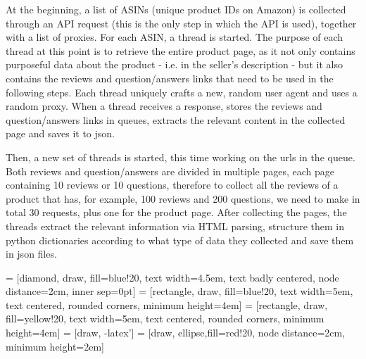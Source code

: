 \documentclass[LaM,binding=0.6cm]{sapthesis}
\begin{document}
At the beginning, a list of ASINs (unique product IDs on Amazon) is collected through an API request (this is the only step in which the API is used), together with a list of proxies. For each ASIN, a thread is started. The purpose of each thread at this point is to retrieve the entire product page, as it not only contains purposeful data about the product - i.e. in the seller's description - but it also contains the reviews and question/answers links that need to be used in the following steps. Each thread uniquely crafts a new, random user agent and uses a random proxy. When a thread receives a response, stores the reviews and question/answers links in queues, extracts the relevant content in the collected page and saves it to json. 

Then, a new set of threads is started, this time working on the urls in the queue. Both reviews and question/answers are divided in multiple pages, each page containing 10 reviews or 10 questions, therefore to collect all the reviews of a product that has, for example, 100 reviews and 200 questions, we need to make in total 30 requests, plus one for the product page. After collecting the pages, the threads extract the relevant information via HTML parsing, structure them in python dictionaries according to what type of data they collected and save them in json files.  

 = [diamond, draw, fill=blue!20, 
    text width=4.5em, text badly centered, node distance=2cm, inner sep=0pt]
 = [rectangle, draw, fill=blue!20, 
    text width=5em, text centered, rounded corners, minimum height=4em]
 = [rectangle, draw, fill=yellow!20, 
    text width=5em, text centered, rounded corners, minimum height=4em]
 = [draw, -latex']
 = [draw, ellipse,fill=red!20, node distance=2cm,
    minimum height=2em]
\end{document}
